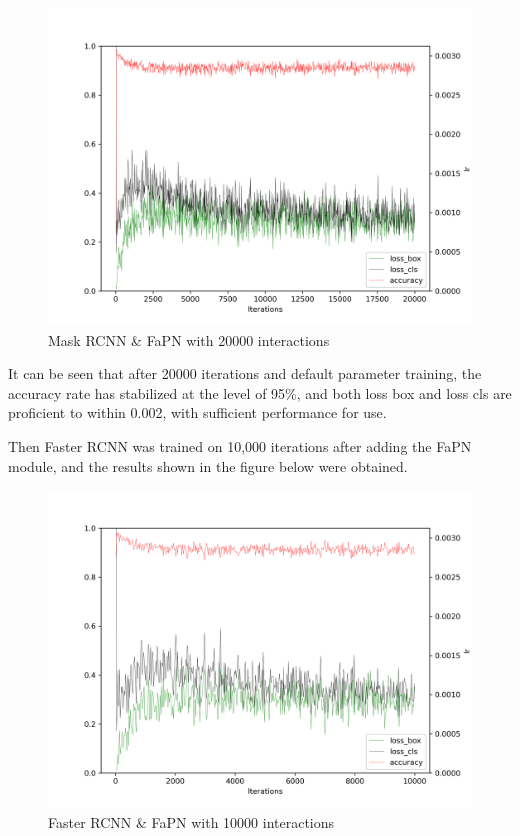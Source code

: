 \begin{figure}[htb]
    \centering
    \includegraphics[width=1\textwidth]{figures/mask_rcnn_r_50_fapn_1x_20000iter.png}
    \caption{Mask RCNN \& FaPN with 20000 interactions}\label{mask_rcnn_r_50_fapn_1x_20000iter}
\end{figure}


It can be seen that after 20000 iterations and default parameter training, the accuracy rate has stabilized at the level of 95\%, and both loss box and loss cls are proficient to within 0.002, with sufficient performance for use.


Then Faster RCNN \cite{ren2015faster} was trained on 10,000 iterations after adding the FaPN module, and the results shown in the figure below were obtained.

\begin{figure}[htb]
    \centering
    \includegraphics[width=1\textwidth]{figures/faster_rcnn_r_50_fapn_1x_10000iter.png}
    \caption{Faster RCNN \& FaPN with 10000 interactions}\label{faster_rcnn_r_50_fapn_1x_10000iter}
\end{figure}


